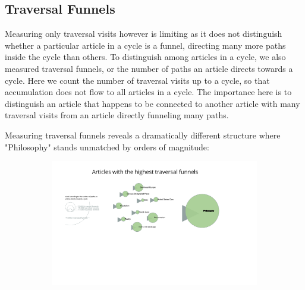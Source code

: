 \documentclass[twoside]{article}
\begin{document}
\subsection{Traversal Funnels}

Measuring only traversal visits however is limiting as it does not distinguish whether a particular article in a cycle 
is a funnel, directing many more paths inside the cycle than others. 
To distinguish among articles in a cycle, we also measured traversal funnels, or the number of 
paths an article directs towards a cycle. Here we count the number of traversal visits up to a cycle, 
so that accumulation does not flow to all articles in a cycle.
The importance here is to distinguish an article that happens to be connected to another article with many traversal visits 
from an article directly funneling many paths.

Measuring traversal funnels reveals a dramatically different structure where "Philosophy" stands unmatched by orders of magnitude:

\begin{figure}[H]
\centering
    \caption{Top Funnels}
    \begin{subfigure}[b]{0.9\textwidth}
        \includegraphics[width=\textwidth]{graphics/funnels.pdf}
    \end{subfigure}
\end{figure}
\end{document}
